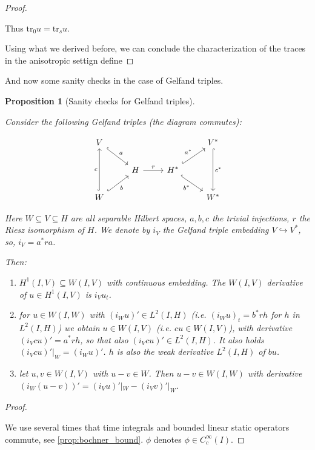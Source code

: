 \documentclass[english,a4paper,9pt,oneside]{scrbook}	%
\theoremstyle{break}
\newtheorem{prop}[equation]{Proposition}
\newenvironment{mproof}[1][\proofname]{%
  \begin{proof}[#1]$ $\par\nobreak\ignorespaces
}{%
  \end{proof}
}
\renewcommand*{\proofname}{Proof}
\theoremstyle{remark}
\newcommand{\tr}{\text{tr}}
\newcommand{\emb}{\hookrightarrow}
\begin{document}
\begin{appendices}
\begin{mproof}
Thus $\tr_0 u = \tr_s u$.

Using what we derived before, we can conclude the characterization of the traces in the anisotropic settign define 

\end{mproof}

And now some sanity checks in the case of Gelfand triples. 

\begin{prop}[Sanity checks for Gelfand triples]
\label{prop:sanity}

Consider the following Gelfand triples (the diagram commutes):

\[\begin{tikzcd}
	{V} &&& {V^*} \\
	& H & {H^*} \\
	{W} &&& {W^*}
	\arrow["c", hook, from=3-1, to=1-1]
	\arrow["a", hook, from=1-1, to=2-2]
	\arrow["b"', hook, from=3-1, to=2-2]
	\arrow["{a^*}", hook, from=2-3, to=1-4]
	\arrow["r", from=2-2, to=2-3]
	\arrow["{b^*}"', hook, from=2-3, to=3-4]
	\arrow["{c^*}", hook, from=1-4, to=3-4]
\end{tikzcd}\]

Here $W\subseteq V \subseteq H$ are all separable Hilbert spaces, $a,b,c$ the trivial injections, $r$ the Riesz isomorphism of $H$. We denote by $i_V$ the Gelfand triple embedding $V\emb V^*$, so, $i_V=a^*ra$.

Then:

\begin{enumerate}
	\item $H^1(I,V)\subseteq W(I,V)$ with continuous embedding. The $W(I,V)$ derivative of $u \in H^1(I,V)$ is $i_V u_t$.
	\item for $u \in W(I,W)$ with $(i_W u)'\in L^2(I,H)$ (i.e. $(i_W u)_t = b^*r h$ for $h$ in $L^2(I,H)$) we obtain $u \in W(I,V)$ (i.e. $cu \in W(I,V)$), with derivative $(i_V cu)'=a^*r h$, so that also $(i_V cu)' \in L^2(I,H)$. It also holds $(i_V cu)'|_W = (i_W u)'$. $h$ is also the weak derivative $L^2(I,H)$ of $bu$.
	\item let $u, v \in W(I,V)$ with $u-v \in W$. Then $u-v \in W(I,W)$ with derivative $(i_W(u-v))'=(i_V u)'|_W-(i_V v)'|_W$.
\end{enumerate}

\end{prop}
\begin{mproof}

We use several times that time integrals and bounded linear static operators commute, see \cref{prop:bochner_bound}. $\phi$ denotes $\phi \in C^\infty_c(I)$.


\end{mproof}
\end{appendices}
\end{document}
